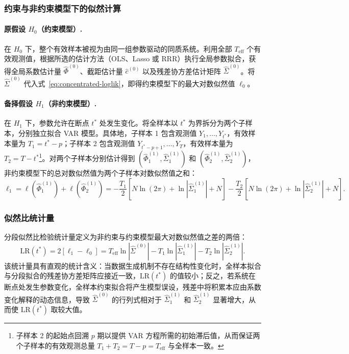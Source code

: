 \subsubsection{约束与非约束模型下的似然计算}

\paragraph{原假设 $H_0$（约束模型）.}
在 $H_0$ 下，整个有效样本被视为由同一组参数驱动的同质系统。利用全部 $T_{\text{eff}}$ 个有效观测值，根据所选的估计方法（OLS、Lasso 或 RRR）执行全局参数拟合，获得全局系数估计量 $\hat{\Phi}^{(0)}$、截距估计量 $\hat{c}^{(0)}$ 以及残差协方差估计矩阵 $\hat{\Sigma}^{(0)}$。将 $\hat{\Sigma}^{(0)}$ 代入式~\eqref{eq:concentrated-loglik}，即得约束模型下的最大对数似然值 $\ell_0$。

\paragraph{备择假设 $H_1$（非约束模型）.}
在 $H_1$ 下，参数允许在断点 $t^*$ 处发生变化。将全样本以 $t^*$ 为界拆分为两个子样本，分别独立拟合 VAR 模型。具体地，子样本 1 包含观测值 $Y_1, \ldots, Y_{t^*}$，有效样本量为 $T_1 = t^* - p$；子样本 2 包含观测值 $Y_{t^*-p+1}, \ldots, Y_T$，有效样本量为 $T_2 = T - t^*$\footnote{子样本 2 的起始点回溯 $p$ 期以提供 VAR 方程所需的初始滞后值，从而保证两个子样本的有效观测总量 $T_1 + T_2 = T - p = T_{\text{eff}}$ 与全样本一致。}。对两个子样本分别估计得到 $(\hat{\Phi}_1^{(1)}, \hat{\Sigma}_1^{(1)})$ 和 $(\hat{\Phi}_2^{(1)}, \hat{\Sigma}_2^{(1)})$，非约束模型下的总对数似然值为两个子样本对数似然值之和：
\begin{equation}\label{eq:loglik-h1}
    \ell_1 = \ell(\hat{\Phi}_1^{(1)}) + \ell(\hat{\Phi}_2^{(1)}) = -\frac{T_1}{2}\left[N\ln(2\pi) + \ln|\hat{\Sigma}_1^{(1)}| + N\right] - \frac{T_2}{2}\left[N\ln(2\pi) + \ln|\hat{\Sigma}_2^{(1)}| + N\right].
\end{equation}

\subsubsection{似然比统计量}

分段似然比检验统计量定义为非约束与约束模型最大对数似然值之差的两倍：
\begin{equation}\label{eq:lr-statistic}
    \mathrm{LR}(t^*) = 2\left[\ell_1 - \ell_0\right] = T_{\text{eff}} \ln|\hat{\Sigma}^{(0)}| - T_1 \ln|\hat{\Sigma}_1^{(1)}| - T_2 \ln|\hat{\Sigma}_2^{(1)}|.
\end{equation}
该统计量具有直观的统计含义：当数据生成机制不存在结构性变化时，全样本拟合与分段拟合的残差协方差矩阵应接近一致，$\mathrm{LR}(t^*)$ 的值较小；反之，若系统在断点处发生参数变化，全样本约束拟合将产生模型误设，残差中将积累本应由系数变化解释的动态信息，导致 $\hat{\Sigma}^{(0)}$ 的行列式相对于 $\hat{\Sigma}_1^{(1)}$ 和 $\hat{\Sigma}_2^{(1)}$ 显著增大，从而使 $\mathrm{LR}(t^*)$ 取较大值。


